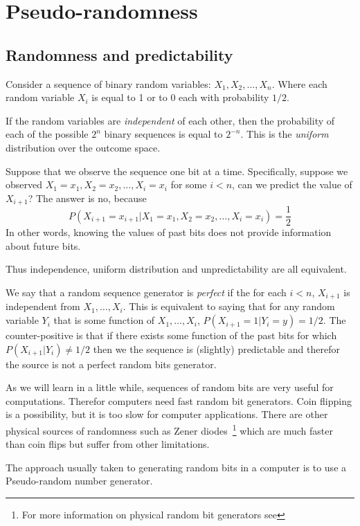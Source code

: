 \chapter{Pseudo-randomness}

\section{Randomness and predictability}

Consider a sequence of binary random variables: $X_1,X_2,\ldots,X_n$.
Where each random variable $X_i$ is equal to 1 or to 0 each with
probability $1/2$.

If the random variables are {\em independent} of each other, then the
probability of each of the possible $2^n$ binary sequences is equal to
$2^{-n}$. This is the {\em uniform} distribution over the outcome space.

Suppose that we observe the sequence one bit at a time. Specifically,
suppose we observed $X_1=x_1,X_2=x_2,\ldots,X_i=x_i$ for some $i<n$,
can we predict the value of $X_{i+1}$? The answer is no, because 
\[
P\left(X_{i+1} =x_{i+1} |
  X_1=x_1,X_2=x_2,\ldots,X_i=x_i\right)=\frac{1}{2}
\]
In other words, knowing the values of past bits does not provide
information about future bits.

Thus independence, uniform distribution and unpredictability are all
equivalent. 

We say that a random sequence generator is {\em perfect} if the
for each $i<n$, $X_{i+1}$ is independent from $X_1,\ldots,X_{i}$.
This is equivalent to saying that for any random variable $Y_i$ that is
some function of $X_1,\ldots,X_{i}$, $P(X_{i+1}=1|Y_i=y)=1/2$. The
counter-positive is that if there exists some function of the past bits
for which $P(X_{i+1}|Y_i)\neq 1/2$ then we the sequence is (slightly) 
predictable and therefor the source is not a perfect random bits
generator.

As we will learn in a little while, sequences of random bits are very
useful for computations. Therefor computers need fast random bit
generators. Coin flipping is a possibility, but it is too slow
for computer applications. There are other physical sources of
randomness such as Zener diodes~\footnote{For more information on
  physical random bit generators see
}
which are much faster than coin flips but suffer from other
limitations.

The approach usually taken to generating random bits in a computer is
to use a {Pseudo-random number generator}.

